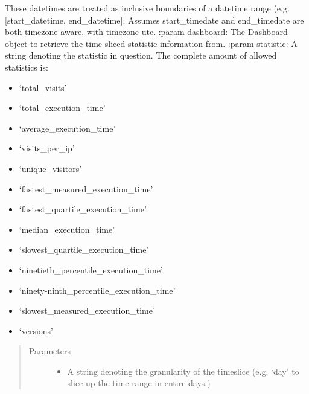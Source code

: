 \documentclass[letterpaper,10pt,english]{sphinxmanual}
\begin{document}
\begin{fulllineitems}
\label{\detokenize{pydash_web.controller.dashboard_statistic:pydash_web.controller.dashboard_statistic.handle_statistic_per_timeslice}}
These datetimes are treated as inclusive boundaries of a datetime range (e.g. {[}start\_datetime, end\_datetime{]}.
Assumes start\_timedate and end\_timedate are both timezone aware, with timezone utc.
:param dashboard: The Dashboard object to retrieve the time-sliced statistic information from.
:param statistic: A string denoting the statistic in question. The complete amount of allowed statistics is:
\begin{itemize}
\item {} 
‘total\_visits’

\item {} 
‘total\_execution\_time’

\item {} 
‘average\_execution\_time’

\item {} 
‘visits\_per\_ip’

\item {} 
‘unique\_visitors’

\item {} 
‘fastest\_measured\_execution\_time’

\item {} 
‘fastest\_quartile\_execution\_time’

\item {} 
‘median\_execution\_time’

\item {} 
‘slowest\_quartile\_execution\_time’

\item {} 
‘ninetieth\_percentile\_execution\_time’

\item {} 
‘ninety-ninth\_percentile\_execution\_time’

\item {} 
‘slowest\_measured\_execution\_time’

\item {} 
‘versions’

\end{itemize}
\begin{quote}\begin{description}
\item[{Parameters}] \leavevmode\begin{itemize}
\item {} 
 \textendash{} A string denoting the granularity of the timeslice (e.g. ‘day’ to slice up the time range in entire days.)


\end{itemize}
\end{description}
\end{quote}
\end{fulllineitems}
\end{document}

